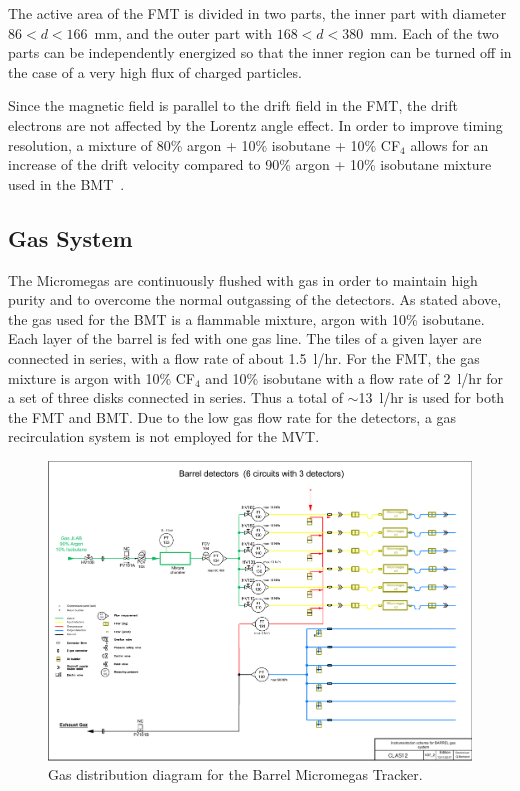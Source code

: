 The active area of the FMT is divided in two parts, the inner part with diameter $86 < d < 166$~mm, and the outer part with
$168 < d < 380$~mm. Each of the two parts can be independently energized so that the inner region can be turned off in the
case of a very high flux of charged particles.

Since the magnetic field is parallel to the drift field in the FMT, the drift electrons are not affected by the Lorentz angle
effect. In order to improve timing resolution, a mixture of 80\% argon + 10\% isobutane + 10\% CF$_4$ allows for an increase
of the drift velocity compared to 90\% argon + 10\% isobutane mixture used in the BMT~\cite{GAS}. 

\subsection{Gas System}

The Micromegas are continuously flushed with gas in order to maintain high purity and to overcome the normal outgassing of the
detectors. As stated above, the gas used for the BMT is a flammable mixture, argon with 10\% isobutane. Each layer of the
barrel is fed with one gas line. The tiles of a given layer are connected in series, with a flow rate of about 1.5~l/hr. For the FMT,
the gas mixture is argon with 10\% CF$_4$ and 10\% isobutane with a flow rate of 2~l/hr for a set of three disks connected
in series. Thus a total of $\sim$13~l/hr is used for both the FMT and BMT. Due to the low gas flow rate for the detectors, a gas
recirculation system is not employed for the MVT. 

\begin{figure}[htb]
\includegraphics[width=2\columnwidth,keepaspectratio]{images/Clas12_Barrel_V07_2}
 \caption{Gas distribution diagram for the Barrel Micromegas Tracker.}
 \label{fig:mm-gas-sys-barrel}
\end{figure}


